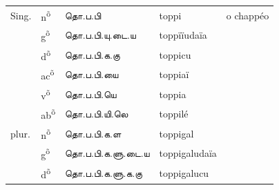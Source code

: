 \documentclass[12pt,a4paper]{scrbook}
\begin{document}
        
\begin{tabular}{lllll}
    
            
                Sing. &
                n\textsuperscript{õ} &
                தொ.ப.பி &
                toppi &
                o chappéo \\
    
            
    
            
                 &
                g\textsuperscript{õ} &
                தொ.ப.பி.யு.டை.ய &
                toppïïudaïa &
                 \\
    
            
    
            
                 &
                d\textsuperscript{õ} &
                தொ.ப.பி.க.கு &
                toppicu &
                 \\
    
            
    
            
                 &
                ac\textsuperscript{õ} &
                தொ.ப.பி.யை &
                toppiaï &
                 \\
    
            
    
            
                 &
                v\textsuperscript{õ} &
                தொ.ப.பி.யெ &
                toppia &
                 \\
    
            
    
            
                 &
                ab\textsuperscript{õ} &
                தொ.ப.பி.யி.லெ &
                toppilé &
                 \\
    
            
    
            
                plur. &
                n\textsuperscript{õ} &
                தொ.ப.பி.க.ள &
                toppigal &
                 \\
    
            
    
            
                 &
                g\textsuperscript{õ} &
                தொ.ப.பி.க.ளு.டை.ய &
                toppigaludaïa &
                 \\
    
            
    
            
                 &
                d\textsuperscript{õ} &
                தொ.ப.பி.க.ளு.க.கு &
                toppigalucu &
                 \\
    

\end{tabular}
\end{document}
